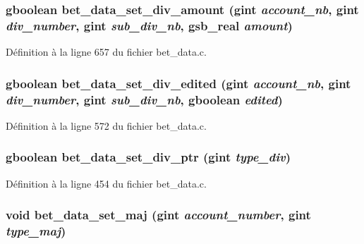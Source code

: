 \subsubsection[{bet\_\-data\_\-set\_\-div\_\-amount}]{\setlength{\rightskip}{0pt plus 5cm}gboolean bet\_\-data\_\-set\_\-div\_\-amount (gint {\em account\_\-nb}, \/  gint {\em div\_\-number}, \/  gint {\em sub\_\-div\_\-nb}, \/  {\bf gsb\_\-real} {\em amount})}\label{bet__data_8h_a3eeebe94c6f939ab1428c4a3860d7884}


Définition à la ligne 657 du fichier bet\_\-data.c.

\subsubsection[{bet\_\-data\_\-set\_\-div\_\-edited}]{\setlength{\rightskip}{0pt plus 5cm}gboolean bet\_\-data\_\-set\_\-div\_\-edited (gint {\em account\_\-nb}, \/  gint {\em div\_\-number}, \/  gint {\em sub\_\-div\_\-nb}, \/  gboolean {\em edited})}\label{bet__data_8h_ac97294377ef5262c8c3940ecdb8e2443}


Définition à la ligne 572 du fichier bet\_\-data.c.

\subsubsection[{bet\_\-data\_\-set\_\-div\_\-ptr}]{\setlength{\rightskip}{0pt plus 5cm}gboolean bet\_\-data\_\-set\_\-div\_\-ptr (gint {\em type\_\-div})}\label{bet__data_8h_aa8173c7d047bf72aef314ecf99689f73}


Définition à la ligne 454 du fichier bet\_\-data.c.

\subsubsection[{bet\_\-data\_\-set\_\-maj}]{\setlength{\rightskip}{0pt plus 5cm}void bet\_\-data\_\-set\_\-maj (gint {\em account\_\-number}, \/  gint {\em type\_\-maj})}\label{bet__data_8h_a9d97dd1579de14c0455d038cc583d448}
